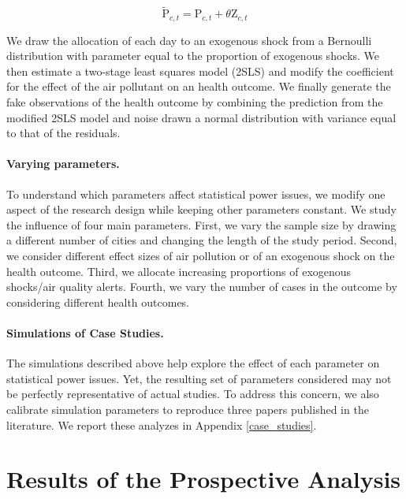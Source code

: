 \documentclass[12pt]{article}
\begin{document}
        \begin{equation*}
        \widetilde{\text{P}}_{c,t} = \text{P}_{c,t} + \theta\text{Z}_{c,t}
        \end{equation*}
        
        \noindent We draw the allocation of each day to an exogenous shock from a Bernoulli distribution with parameter equal to the proportion of exogenous shocks. We then estimate a two-stage least squares model (2SLS) and modify the coefficient for the effect of the air pollutant on an health outcome. We finally generate the fake observations of the health outcome by combining the prediction from the modified 2SLS model and noise drawn a normal distribution with variance equal to that of the residuals.
        
        \paragraph{Varying parameters.} To understand which parameters affect statistical power issues, we modify one aspect of the research design while keeping other parameters constant. We study the influence of four main parameters. First, we vary the sample size by drawing a different number of cities and changing the length of the study period. Second, we consider different effect sizes of air pollution or of an exogenous shock on the health outcome. Third, we allocate increasing proportions of exogenous shocks/air quality alerts. Fourth, we vary the number of cases in the outcome by considering different health outcomes.

        \paragraph{Simulations of Case Studies.} The simulations described above help explore the effect of each parameter on statistical power issues. Yet, the resulting set of parameters considered may not be perfectly representative of actual studies. To address this concern, we also calibrate simulation parameters to reproduce three papers published in the literature. We report these analyzes in Appendix \ref{case_studies}.




\section{Results of the Prospective Analysis}\label{section_results}
\end{document}
